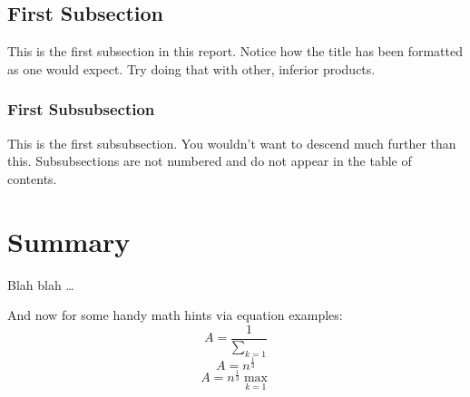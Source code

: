 \subsection{First Subsection}

This is the first subsection in this report. Notice how the title has been
formatted as one would expect. Try doing that with other, inferior products.

\subsubsection{First Subsubsection}

This is the first subsubsection. You wouldn't want to descend much further
than this. Subsubsections are not numbered and do not appear in the table of
contents.

\section{Summary}

Blah blah \ldots

And now for some handy math hints via equation examples:
\begin{equation}
A=\frac{1}{\displaystyle\sum_{k=1}^{}}
\end{equation}
\begin{equation}
A=n^{\frac{1}{3}}
\end{equation}
\begin{equation}
A=n^{\frac{1}{3}}\max_{k=1}
\end{equation}